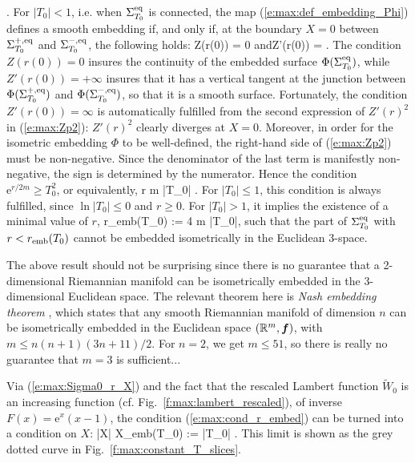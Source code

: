     .
\ee
For $|T_0|<1$, i.e. when $\Sigma_{T_0}^{\rm eq}$ is connected, the
map (\ref{e:max:def_embedding_Phi}) defines a smooth embedding if, and only
if, at the boundary $X=0$ between $\Sigma_{T_0}^{+,\rm eq}$ and
$\Sigma_{T_0}^{-,\rm eq}$, the following holds:
\be
    Z(r(0)) = 0 \quad\mbox{and}\quad Z'(r(0)) = \infty .
\ee
The condition $Z(r(0)) = 0$ insures the continuity of the embedded surface
$\Phi(\Sigma_{T_0}^{\rm eq})$,
while $Z'(r(0)) = +\infty$ insures that it has a vertical tangent at
the junction between $\Phi(\Sigma_{T_0}^{+,\rm eq})$ and
$\Phi(\Sigma_{T_0}^{-,\rm eq})$, so that it is
a smooth surface. Fortunately, the condition $Z'(r(0)) = \infty$
is automatically fulfilled from the second expression of
$Z'(r)^2$ in (\ref{e:max:Zp2}): $Z'(r)^2$ clearly diverges at $X=0$.
Moreover, in order for the isometric embedding $\Phi$ to be well-defined, the right-hand side
of (\ref{e:max:Zp2}) must be non-negative. Since the denominator of the last
term is manifestly non-negative, the sign is determined by the numerator. Hence
the condition $\mathrm{e}^{r/2m} \geq T_0^2$, or equivalently,
\be \label{e:max:cond_r_embed}
    r  m \ln |T_0| .
\ee
For $|T_0|\leq 1$, this condition is always fulfilled, since $\ln |T_0| \leq 0$
and $r \geq 0$. For $|T_0| > 1$, it implies the existence of a minimal value
of $r$,
\be \label{e:max:r_emb}
    r_{\rm emb}(T_0) :=  4 m \ln |T_0|,
\ee
such that the part of $\Sigma_{T_0}^{\rm eq}$ with $r< r_{\rm emb}(T_0)$
cannot be embedded isometrically in the Euclidean 3-space.
\begin{remark}
The above result should not be surprising since there is
no guarantee that a 2-dimensional Riemannian manifold can
be isometrically embedded in the 3-dimensional Euclidean space.
The relevant theorem here is \emph{Nash embedding theorem} \cite{Nash56}, which
states that any smooth Riemannian manifold of dimension $n$ can be isometrically
embedded in the Euclidean space $(\mathbb{R}^m,\bm{f})$, with $m \leq n(n+1)(3n+11)/2$.
For $n=2$, we get $m\leq 51$, so there is really no guarantee that $m=3$
is sufficient...
\end{remark}

Via (\ref{e:max:Sigma0_r_X}) and the fact that the rescaled Lambert function
$\tilde{W}_0$ is an increasing function (cf. Fig.~\ref{f:max:lambert_rescaled}), of inverse $F(x)=\mathrm{e}^x(x-1)$,
the condition (\ref{e:max:cond_r_embed}) can be turned into a condition
on $X$:
\be
    |X| \geq X_{\rm emb}(T_0) := |T_0|  .
\ee
This limit is shown as the grey dotted curve in Fig.~\ref{f:max:constant_T_slices}.

